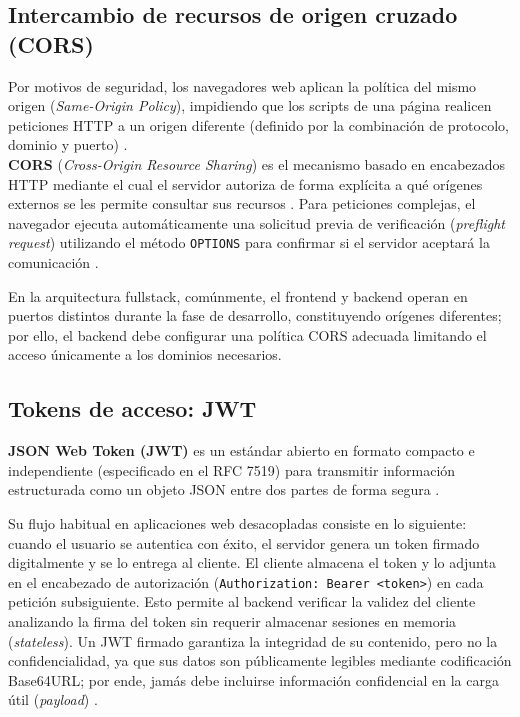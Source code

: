 	\newpage
	
	\subsection{Intercambio de recursos de origen cruzado (CORS)}
	Por motivos de seguridad, los navegadores web aplican la pol\'itica del mismo origen (\textit{Same-Origin Policy}), impidiendo que los scripts de una p\'agina realicen peticiones HTTP a un origen diferente (definido por la combinaci\'on de protocolo, dominio y puerto) \cite{mdn_cors}. \\
	
	\textbf{CORS} (\textit{Cross-Origin Resource Sharing}) es el mecanismo basado en encabezados HTTP mediante el cual el servidor autoriza de forma expl\'icita a qu\'e or\'igenes externos se les permite consultar sus recursos \cite{mdn_cors}. Para peticiones complejas, el navegador ejecuta autom\'aticamente una solicitud previa de verificaci\'on (\textit{preflight request}) utilizando el m\'etodo \texttt{OPTIONS} para confirmar si el servidor aceptar\'a la comunicaci\'on \cite{mdn_cors}.
	
	\begin{notabox}
		En la arquitectura fullstack, com\'unmente, el frontend y backend operan en puertos distintos durante la fase de desarrollo, constituyendo or\'igenes diferentes; por ello, el backend debe configurar una pol\'itica CORS adecuada limitando el acceso \'unicamente a los dominios necesarios.
	\end{notabox}
	
	\subsection{Tokens de acceso: JWT}
	
	\textbf{JSON Web Token (JWT)} es un est\'andar abierto en formato compacto e independiente (especificado en el RFC 7519) para transmitir informaci\'on estructurada como un objeto JSON entre dos partes de forma segura \cite{jwt_io, rfc7519}.
	
	Su flujo habitual en aplicaciones web desacopladas consiste en lo siguiente: cuando el usuario se autentica con \'exito, el servidor genera un token firmado digitalmente y se lo entrega al cliente. El cliente almacena el token y lo adjunta en el encabezado de autorizaci\'on (\texttt{Authorization: Bearer <token>}) en cada petici\'on subsiguiente. Esto permite al backend verificar la validez del cliente analizando la firma del token sin requerir almacenar sesiones en memoria (\textit{stateless}). Un JWT firmado garantiza la integridad de su contenido, pero no la confidencialidad, ya que sus datos son p\'ublicamente legibles mediante codificaci\'on Base64URL; por ende, jam\'as debe incluirse informaci\'on confidencial en la carga \'util (\textit{payload}) \cite{jwt_io}.
	
